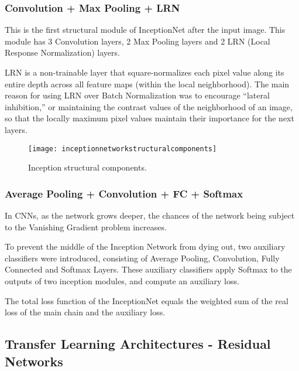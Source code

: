 	\subsubsection{Convolution + Max Pooling + LRN}
	\begin{bulletedlist}
		\item This is the first structural module of InceptionNet after the input image. This module has 3 Convolution layers, 2 Max Pooling layers and 2 LRN (Local Response Normalization) layers.
		\item LRN is a non-trainable layer that square-normalizes each pixel value along its entire depth across all feature maps (within the local neighborhood). The main reason for using LRN over Batch Normalization was to encourage ``lateral inhibition,'' or maintaining the contrast values of the neighborhood of an image, so that the locally maximum pixel values maintain their importance for the next layers.
	\end{bulletedlist}

	\begin{figure}[tbh]
		\centering
		\texttt{[image: inceptionnetworkstructuralcomponents]}
		\caption[Inception structural components]{Inception structural components.}
		\label{fig:inceptionnetworkstructuralcomponents}
	\end{figure}

	\subsubsection{Average Pooling + Convolution + FC + Softmax}	
	\begin{bulletedlist}
		\item In CNNs, as the network grows deeper, the chances of the network being subject to the Vanishing Gradient problem increases.
		\item To prevent the middle of the Inception Network from dying out, two auxiliary classifiers were introduced, consisting of Average Pooling, Convolution, Fully Connected and Softmax Layers.  These auxiliary classifiers apply Softmax to the outputs of two inception modules, and compute an auxiliary loss.
		\item The total loss function of the InceptionNet equals the weighted sum of the real loss of the main chain and the auxiliary loss.
	\end{bulletedlist}




	\subsection{Transfer Learning Architectures - Residual Networks}



